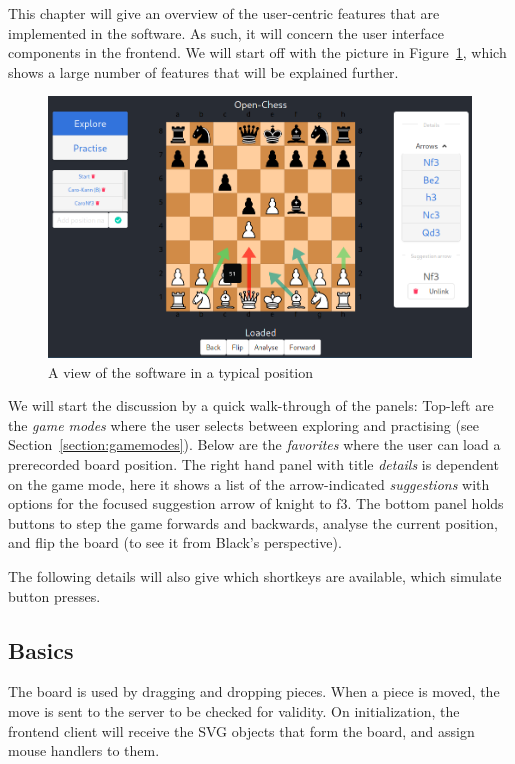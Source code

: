 \documentclass[architecture.tex]{subfiles}
\begin{document}
This chapter will give an overview of the user-centric features
that are implemented in the software. As such, it will concern the
user interface components in the frontend.
We will start off with the picture in Figure~\ref{fig:explore}, which
shows a large number of features that will be explained further.
\begin{figure}[H]
    \centering
    \includegraphics[width=\linewidth]{figures/explore-overview.png}
    \caption{A view of the software in a typical position}
    \label{fig:explore}
\end{figure}
We will start the discussion by a quick walk-through of the panels:
Top-left are the \textit{game modes} where the user selects between
exploring and practising (see Section~\ref{section:gamemodes}).
Below are the \textit{favorites} where the user can load a prerecorded
board position.
The right hand panel with title \textit{details} is dependent on the game mode,
here it shows a list of the arrow-indicated \textit{suggestions} with
options for the focused suggestion arrow of knight to f3.
The bottom panel holds buttons to step the game forwards and backwards,
analyse the current position, and flip the board (to see it from Black's perspective).

The following details will also give which shortkeys are available,
which simulate button presses.
\subsection{Basics}
The board is used by dragging and dropping pieces. When a piece is moved,
the move is sent to the server to be checked for validity.
On initialization, the frontend client will receive the SVG objects that
form the board, and assign mouse handlers to them.
\end{document}
